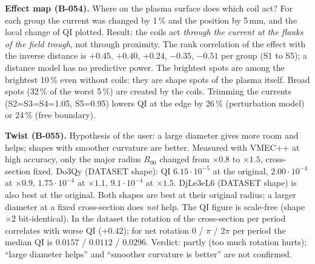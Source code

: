 \textbf{Effect map (B-054).} Where on the plasma surface does which coil act? For each group the current was changed by 1\,\% and the position by 5\,mm, and the
local change of QI plotted. Result: the coils act \emph{through the current at the flanks of the field trough}, not through proximity. The rank correlation of the effect with the
inverse distance is $+0.45$, $+0.40$, $+0.24$, $-0.35$, $-0.51$ per group (S1 to S5); a distance model has no predictive power. The brightest
spots are among the brightest 10\,\% even without coils: they are shape spots of the plasma itself. Broad spots (32\,\% of the worst 5\,\%) are created by the coils.
Trimming the currents (S2=S3=S4=1.05, S5=0.95) lowers QI at the edge by 26\,\% (perturbation model) or 24\,\% (free boundary).

\textbf{Twist (B-055).} Hypothesis of the user: a large diameter gives more room and helps; shapes with smoother curvature are better. Measured with
VMEC++ at high accuracy, only the major radius $R_{00}$ changed from $\times0.8$ to $\times1.5$, cross-section fixed. Do3Qy (DATASET shape): QI $6.15\cdot10^{-5}$ at the original,
$2.00\cdot10^{-4}$ at $\times0.9$, $1.75\cdot10^{-4}$ at $\times1.1$, $9.1\cdot10^{-4}$ at $\times1.5$. DjLe3eL6 (DATASET shape) is also best at the original. Both
shapes are best at their original radius; a larger diameter at a fixed cross-section does \emph{not} help. The QI figure is scale-free (shape $\times2$ bit-identical). In the dataset
the rotation of the cross-section per period correlates with worse QI ($+0.42$); for net rotation 0 / $\pi$ / $2\pi$ per period the median QI is $0.0157$ / $0.0112$ / $0.0296$.
Verdict: partly (too much rotation hurts); ``large diameter helps'' and ``smoother curvature is better'' are not confirmed.

